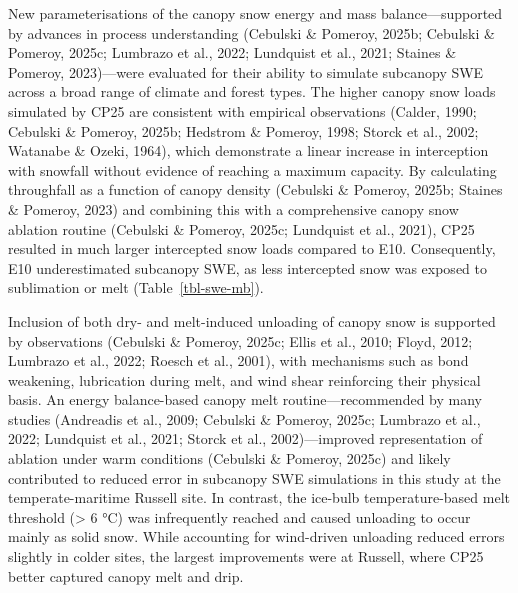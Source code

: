 \documentclass[
  letterpaper,
]{tex/uofsthesis-cs}
\begin{document}
New parameterisations of the canopy snow energy and mass
balance---supported by advances in process understanding (Cebulski \&
Pomeroy, 2025b; Cebulski \& Pomeroy, 2025c; Lumbrazo et al., 2022;
Lundquist et al., 2021; Staines \& Pomeroy, 2023)---were evaluated for
their ability to simulate subcanopy SWE across a broad range of climate
and forest types. The higher canopy snow loads simulated by CP25 are
consistent with empirical observations (Calder, 1990; Cebulski \&
Pomeroy, 2025b; Hedstrom \& Pomeroy, 1998; Storck et al., 2002; Watanabe
\& Ozeki, 1964), which demonstrate a linear increase in interception
with snowfall without evidence of reaching a maximum capacity. By
calculating throughfall as a function of canopy density (Cebulski \&
Pomeroy, 2025b; Staines \& Pomeroy, 2023) and combining this with a
comprehensive canopy snow ablation routine (Cebulski \& Pomeroy, 2025c;
Lundquist et al., 2021), CP25 resulted in much larger intercepted snow
loads compared to E10. Consequently, E10 underestimated subcanopy SWE,
as less intercepted snow was exposed to sublimation or melt
(Table~\ref{tbl-swe-mb}).

Inclusion of both dry- and melt-induced unloading of canopy snow is
supported by observations (Cebulski \& Pomeroy, 2025c; Ellis et al.,
2010; Floyd, 2012; Lumbrazo et al., 2022; Roesch et al., 2001), with
mechanisms such as bond weakening, lubrication during melt, and wind
shear reinforcing their physical basis. An energy balance-based canopy
melt routine---recommended by many studies (Andreadis et al., 2009;
Cebulski \& Pomeroy, 2025c; Lumbrazo et al., 2022; Lundquist et al.,
2021; Storck et al., 2002)---improved representation of ablation under
warm conditions (Cebulski \& Pomeroy, 2025c) and likely contributed to
reduced error in subcanopy SWE simulations in this study at the
temperate-maritime Russell site. In contrast, the ice-bulb
temperature-based melt threshold (\textgreater{} 6 °C) was infrequently
reached and caused unloading to occur mainly as solid snow. While
accounting for wind-driven unloading reduced errors slightly in colder
sites, the largest improvements were at Russell, where CP25 better
captured canopy melt and drip.
\end{document}
